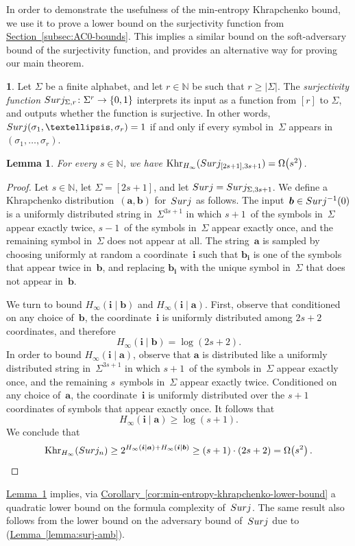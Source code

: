 \documentclass[11pt]{article}
\makeatletter
\numberwithin{equation}{section}
\newtheorem{lemma}[theorem]{Lemma}
\theoremstyle{definition}
\theoremstyle{plain}
\newcommand{\N}{\mathbb N}
\newcommand{\expref}[2]{\hyperref[#2]{#1~\ref{#2}}}
\theoremstyle{definition}\newtheorem{notation}[theorem]{Notation}\theoremstyle{plain}
\renewcommand{\N}{\mathbb{N}}
\newcommand{\surj}{\textup{\textsf{Surj}}}
\renewcommand{\a}{\boldsymbol{a}}
\renewcommand{\b}{\boldsymbol{b}}
\renewcommand{\i}{\boldsymbol{i}}
\newcommand{\Hm}{H_{\infty}}
\newcommand{\K}{\mathrm{Khr}}
\newcommand{\Km}{\K_{\Hm}}
\theoremstyle{definition}
\newtheorem*{rep@definition}{\rep@ref}
\newenvironment{repdefinition}[1]{
 \def\rep@ref{#1}
 \begin{rep@definition}}
 {\end{rep@definition}}
\theoremstyle{plain}
\makeatother
\begin{document}
In order to demonstrate the usefulness of the min-entropy Khrapchenko
bound, we use it to prove a lower bound on the surjectivity function
from \expref{Section}{subsec:AC0-bounds}. This implies a similar bound on the
soft-adversary bound of the surjectivity function, and provides an
alternative way for proving our main theorem.
\begin{repdefinition}{\expref{Definition}{def:surjectivity}}
Let $\Sigma$ be a finite alphabet, and let $r\in\N$ be such that
$r\ge\left|\Sigma\right|$. The \emph{surjectivity function} $\surj_{\Sigma,r}\colon\Sigma^{r}\to\{0,1\}$
interprets its input as a function from $\left[r\right]$ to $\Sigma$,
and outputs whether the function is surjective. In other words, $\surj(\sigma_{1},\ldots,\sigma_{r})=1$
if and only if every symbol in~$\Sigma$ appears in~$(\sigma_{1},\ldots,\sigma_{r})$.
\end{repdefinition}

\begin{lemma}
\label{lemma:surj-khrap}For every $s\in\N$, we have $\Km(\surj_{\left[2s+1\right],3s+1})=\Omega\bigl(s^{2}\bigr)$. 
\end{lemma}

\begin{proof}
Let $s\in\N$, let $\Sigma=\left[2s+1\right]$, and let $\surj=\surj_{\Sigma,3s+1}$.
We define a Khrapchenko distribution~$(\a,\b)$ for~$\surj$ as
follows. The input~$\b\in\surj^{-1}(0)$ is a uniformly distributed
string in~$\Sigma^{3s+1}$ in which $s+1$~of the symbols in~$\Sigma$
appear exactly twice, $s-1$~of the symbols in~$\Sigma$ appear
exactly once, and the remaining symbol in~$\Sigma$ does not appear
at all. The string~$\a$ is sampled by choosing uniformly at random
a coordinate~$\i$ such that $\b_{\i}$ is one of the symbols that
appear twice in~$\b$, and replacing $\b_{\i}$ with the unique symbol
in~$\Sigma$ that does not appear in~$\b$.

We turn to bound $\Hm(\i\mid\b)$ and $\Hm(\i\mid\a)$. First, observe
that conditioned on any choice of~$\b$, the coordinate~$\i$ is
uniformly distributed among $2s+2$ coordinates, and therefore 
\[
\Hm(\i\mid\b)=\log(2s+2).
\]
In order to bound $\Hm(\i\mid\a)$, observe that $\a$ is distributed
like a uniformly distributed string in~$\Sigma^{3s+1}$ in which
$s+1$~of the symbols in~$\Sigma$ appear exactly once, and the
remaining $s$~symbols in~$\Sigma$ appear exactly twice. Conditioned
on any choice of~$\a$, the coordinate~$\i$ is uniformly distributed
over the $s+1$ coordinates of symbols that appear exactly once. It
follows that 
\[
\Hm(\i\mid\a)\ge\log(s+1).
\]
We conclude that
\[
\Km(\surj_{n})\ge2^{\Hm(\i\mid\a)+\Hm(\i\mid\b)}\ge(s+1)\cdot(2s+2)=\Omega\!\left(s^{2}\right).\qedhere
\]
\end{proof}
\expref{Lemma}{lemma:surj-khrap} implies, via 
\expref{Corollary}{cor:min-entropy-khrapchenko-lower-bound}
a quadratic lower bound on the formula complexity of~$\surj$. The
same result also follows from the lower bound on the adversary bound
of~$\surj$ due to~\cite{BM12} (\expref{Lemma}{lemma:surj-amb}).
\end{document}
